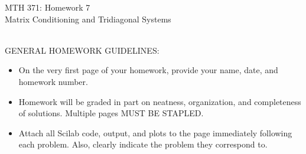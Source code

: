 \documentclass[addpoints, 11pt]{exam}
\begin{document}
\vspace{100mm}
\begin{center} \Large
MTH 371: Homework 7 \\ Matrix Conditioning and Tridiagonal Systems \normalsize
\end{center}
\ \\
\noindent GENERAL HOMEWORK GUIDELINES: 
\begin{itemize}
\item On the very first page of your homework, provide your name, date, and homework number.\vspace{-2mm}
\item Homework will be graded in part on neatness, organization, and completeness of solutions. Multiple pages MUST BE STAPLED. \vspace{-2mm}
\item Attach all Scilab code, output, and plots to the page immediately following each problem. Also, clearly indicate the problem they correspond to.
\end{itemize}
\end{document}
